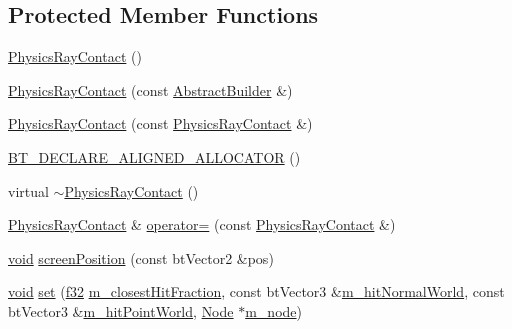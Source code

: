 \subsection*{Protected Member Functions}
\begin{DoxyCompactItemize}
\item 
\mbox{\hyperlink{classnjli_1_1_physics_ray_contact_aaf35d126b209d8f09270fad928faa51a}{Physics\+Ray\+Contact}} ()
\item 
\mbox{\hyperlink{classnjli_1_1_physics_ray_contact_adf6960ca7a232ee4d2d58afc105c1883}{Physics\+Ray\+Contact}} (const \mbox{\hyperlink{classnjli_1_1_abstract_builder}{Abstract\+Builder}} \&)
\item 
\mbox{\hyperlink{classnjli_1_1_physics_ray_contact_a158613e1edba5d0175a8a0cdddde1109}{Physics\+Ray\+Contact}} (const \mbox{\hyperlink{classnjli_1_1_physics_ray_contact}{Physics\+Ray\+Contact}} \&)
\item 
\mbox{\hyperlink{classnjli_1_1_physics_ray_contact_a55b296d9dbe3cf8aa8e886a75fc8c0a3}{B\+T\+\_\+\+D\+E\+C\+L\+A\+R\+E\+\_\+\+A\+L\+I\+G\+N\+E\+D\+\_\+\+A\+L\+L\+O\+C\+A\+T\+OR}} ()
\item 
virtual \mbox{\hyperlink{classnjli_1_1_physics_ray_contact_a75d11d2cb2a59dadec4cf08c8d74b863}{$\sim$\+Physics\+Ray\+Contact}} ()
\item 
\mbox{\hyperlink{classnjli_1_1_physics_ray_contact}{Physics\+Ray\+Contact}} \& \mbox{\hyperlink{classnjli_1_1_physics_ray_contact_a02b26a7d8039cbf2b595f517bbfaa166}{operator=}} (const \mbox{\hyperlink{classnjli_1_1_physics_ray_contact}{Physics\+Ray\+Contact}} \&)
\item 
\mbox{\hyperlink{_thread_8h_af1e856da2e658414cb2456cb6f7ebc66}{void}} \mbox{\hyperlink{classnjli_1_1_physics_ray_contact_ae44f643d72f6feff01536b0514ea2cf9}{screen\+Position}} (const bt\+Vector2 \&pos)
\item 
\mbox{\hyperlink{_thread_8h_af1e856da2e658414cb2456cb6f7ebc66}{void}} \mbox{\hyperlink{classnjli_1_1_physics_ray_contact_ab8995b347efdd2ad6d096dd0a0359977}{set}} (\mbox{\hyperlink{_util_8h_a5f6906312a689f27d70e9d086649d3fd}{f32}} \mbox{\hyperlink{classnjli_1_1_physics_ray_contact_ab45c460f290a435ea879528f4dd5b372}{m\+\_\+closest\+Hit\+Fraction}}, const bt\+Vector3 \&\mbox{\hyperlink{classnjli_1_1_physics_ray_contact_a3cc7540d9aff7dad7860e6910aad7b41}{m\+\_\+hit\+Normal\+World}}, const bt\+Vector3 \&\mbox{\hyperlink{classnjli_1_1_physics_ray_contact_a8bb6d7b4281cb7a5f36e28f87d1a2d77}{m\+\_\+hit\+Point\+World}}, \mbox{\hyperlink{classnjli_1_1_node}{Node}} $\ast$\mbox{\hyperlink{classnjli_1_1_physics_ray_contact_ae315ed84ad9ab0f019a7a515f5a30f34}{m\+\_\+node}})
\end{DoxyCompactItemize}
